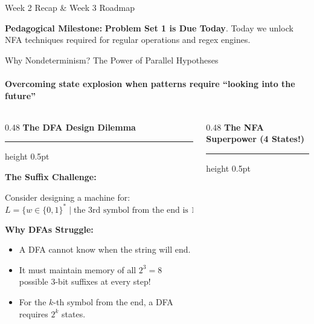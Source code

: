 \documentclass[aspectratio=169, 10pt]{beamer}
\newcommand{\colheader}[1]{%
  {\noindent\footnotesize\bfseries\color{gimpanavy}#1}%
  \vspace{0.02cm}%
  {\color{gimpanavy!30}\hrule height 0.5pt}%
  \vspace{0.05cm}%
}
\newcommand{\cardtitle}[1]{{\noindent\footnotesize\bfseries\color{gimpanavy}#1}\par\vspace{0.03cm}}
\begin{document}
\begin{frame}{Week 2 Recap \& Week 3 Roadmap}
  \vspace{0.04cm}
  \begin{tcolorbox}[alertcard]
    {\scriptsize\textbf{Pedagogical Milestone:} \textbf{Problem Set 1 is Due Today}. Today we unlock NFA techniques required for regular operations and regex engines.}
  \end{tcolorbox}
\end{frame}

\begin{frame}{Why Nondeterminism? The Power of Parallel Hypotheses}
  \framesubtitle{Overcoming state explosion when patterns require ``looking into the future''}
  
  \begin{columns}[T]
    \begin{column}{0.48\textwidth}
      \colheader{The DFA Design Dilemma}
      \begin{tcolorbox}[conceptcard]
        \cardtitle{The Suffix Challenge:}
        {\scriptsize
        Consider designing a machine for:
        \[ L = \{w \in \{0, 1\}^* \mid \text{the 3rd symbol from the end is } 1\} \]
        \vspace{0.02cm}
        
        \textbf{Why DFAs Struggle:}
        \begin{itemize}\setlength{\itemsep}{1.5pt}\scriptsize
          \item A DFA cannot know when the string will end.
          \item It must maintain memory of all $2^3 = 8$ possible 3-bit suffixes at every step!
          \item For the $k$-th symbol from the end, a DFA requires $2^k$ states.
        \end{itemize}
        }
      \end{tcolorbox}
    \end{column}
    
    \begin{column}{0.48\textwidth}
      \colheader{The NFA Superpower (4 States!)}
      \begin{center}
\end{center}
\end{column}
\end{columns}
\end{frame}
\end{document}
